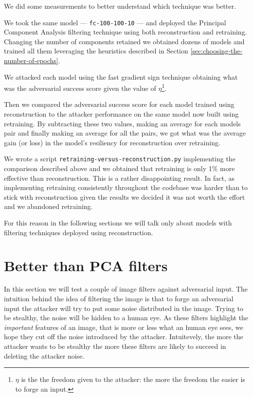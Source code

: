 We did some measurements to better understand which technique was
better.

We took the same model --- \texttt{fc-100-100-10} --- and deployed the
Principal Component Analysis \cite{wall2003singular}
filtering technique using both reconstruction and retraining. Changing
the number of components retained we
obtained dozens of models and trained all them leveraging the
heuristics described in Section
\ref{sec:choosing-the-number-of-epochs}.

We attacked each model using the fast gradient sign technique obtaining
what was the adversarial success score given the value of
$\eta$\footnote{$\eta$ is the the freedom given to the attacker: the
  more the freedom the easier is to forge an input.}.

Then we compared the adversarial success score for each model trained
using reconstruction to the attacker performance on the same model now
built using retraining. By subtracting these two values, making an
average for each models pair and finally making an average for all the
pairs, we got what was the average gain (or loss) in the model's
resiliency for reconstruction over retraining.

We wrote a script \texttt{retraining-versus-reconstruction.py}
implementing the comparison described above and we obtained that
retraining is only 1\% more effective than reconstruction. This is a
rather disappointing result. In fact, as implementing retraining
consistently throughout the codebase was harder than to stick with
reconstruction given the results we decided it was not worth the effort
and we abandoned retraining.

For this reason in the following sections we will talk only about models
with filtering techniques deployed using reconstruction.

\section{Better than PCA filters}
\label{sec:better-than-pca-filters}

In this section we will test a couple of image filters against
adversarial input. The intuition behind the idea of filtering the image
is that to forge an adversarial input the attacker will try to put some
noise distributed in the image. Trying to be stealthy, the noise will be
hidden to a human eye. As these filters highlight the \emph{important}
features of an image, that is more or less what an human eye sees, we
hope they cut off the noise introduced by the attacker. Intuitevely,
the more the attacker wants to be stealthy the more these filters are
likely to succeed in deleting the attacker noise.

